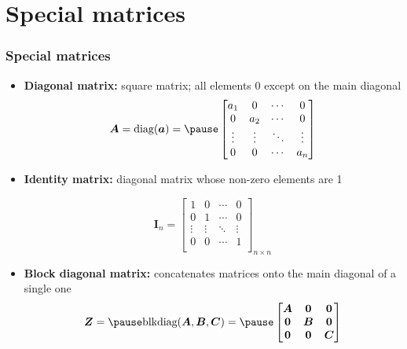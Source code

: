 \documentclass[smaller]{beamer}
\newcommand{\?}{\stackrel{?}{=}}
\begin{document}
\section{Special matrices}
\begin{frame}
	\frametitle{Special matrices}
	\pause
	
	\begin{itemize}
		\item \textbf{Diagonal matrix:} square matrix; all elements 0 except on the main diagonal
		\pause
		\begin{equation*}
			\bm A = \text{diag}(\bm a) = \pause
			\begin{bmatrix}
				a_{1} & 0 & \cdots & 0 \\
				0 & a_{2} & \cdots & 0 \\
				\vdots & \vdots & \ddots & \vdots \\
				0 & 0  & \cdots & a_{n} \\        
			\end{bmatrix}
		\end{equation*}
		
		\pause
		\item \textbf{Identity matrix:} diagonal matrix whose non-zero elements are 1 \pause
		
		\begin{equation*}
			\bm I_{n} =
			\begin{bmatrix}
				1 & 0 & \cdots & 0 \\
				0 & 1 & \cdots & 0 \\
				\vdots & \vdots & \ddots & \vdots \\
				0 & 0  & \cdots & 1 \\         
			\end{bmatrix}_{n\times n}
		\end{equation*}
		\pause
		
		\item \textbf{Block diagonal matrix:} concatenates matrices onto the main diagonal of a single one
		\pause
		\begin{equation*}
			\bm Z = \pause
			\text{blkdiag}(\bm A, \bm B, \bm C) = \pause
			\begin{bmatrix}
				\bm A & \bm 0 & \bm 0 \\
				\bm 0 & \bm B & \bm 0 \\
				\bm 0 & \bm 0 & \bm C
			\end{bmatrix}
		\end{equation*}
	\end{itemize}
\end{frame}
\end{document}
